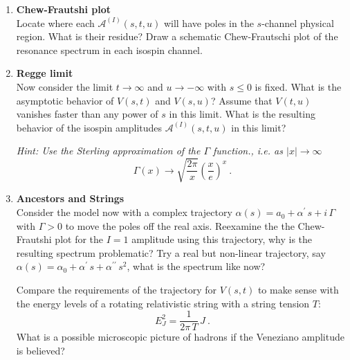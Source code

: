 \begin{enumerate}
\item \textbf{Chew-Frautshi plot} \\
Locate where each $\mathcal{A}^{(I)}(s,t,u)$ will have poles in the $s$-channel physical region. What is their residue? Draw a schematic Chew-Frautschi plot of the resonance spectrum in each isospin channel.

\item \textbf{Regge limit} \\
Now consider the limit $t \to \infty$ and $u \to - \infty$ with $s \leq 0$ is fixed. What is the asymptotic behavior of $V(s,t)$ and $V(s,u)$? Assume that $V(t,u)$ vanishes faster than any power of $s$ in this limit. What is the resulting behavior of the isospin amplitudes $\mathcal{A}^{(I)}(s,t,u)$ in this limit?

\noindent \textit{ Hint: Use the Sterling approximation of the $\Gamma$ function., i.e. as $|x|\to \infty$
    \begin{equation}
        \Gamma(x) \to \sqrt{\frac{2\pi}{x}} \left( \frac{x}{e} \right)^x ~.
    \end{equation}
}

\item \textbf{Ancestors and Strings}\\
Consider the model now with a complex trajectory $\alpha(s) = a_0 + \alpha^\prime \, s + i \,\Gamma$ with $\Gamma > 0$ to move the poles off the real axis. Reexamine the the Chew-Frautshi plot for the $I=1$ amplitude using this trajectory, why is the resulting spectrum problematic? Try a real but non-linear trajectory, say $\alpha(s) = \alpha_0 + \alpha^\prime \, s + \alpha^{\prime\prime} \, s^2$, what is the spectrum like now?

Compare the requirements of the trajectory for $V(s,t)$ to make sense with the energy levels of a rotating relativistic string with a string tension $T$:
    \begin{equation}
        E_J^2 = \frac{1}{2\pi \, T} \, J ~.
    \end{equation}
What is a possible microscopic picture of hadrons if the Veneziano amplitude is believed? 
\end{enumerate}